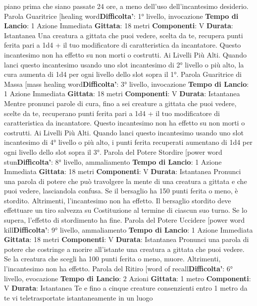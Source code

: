 \begin{multicols}{2}
piano prima che siano passate 24 ore, a meno dell’uso
dell’incantesimo desiderio.
Parola Guaritrice
[healing word\textbf{Difficolta'}:
1° livello, invocazione
\textbf{Tempo di Lancio}: 1 Azione Immediata
\textbf{Gittata}: 18 metri
\textbf{Componenti}: V
\textbf{Durata}: Istantanea
Una creatura a gittata che puoi vedere, scelta da te,
recupera punti ferita pari a 1d4 + il tuo modificatore di
caratteristica da incantatore. Questo incantesimo non
ha effetto su non morti o costrutti.
Ai Livelli Più Alti. Quando lanci questo incantesimo
usando uno slot incantesimo di 2° livello o più alto, la
cura aumenta di 1d4 per ogni livello dello slot sopra il
1°.
Parola Guaritrice di Massa
[mass healing word\textbf{Difficolta'}:
3° livello, invocazione
\textbf{Tempo di Lancio}: 1 Azione Immediata
\textbf{Gittata}: 18 metri
\textbf{Componenti}: V
\textbf{Durata}: Istantanea
Mentre pronunci parole di cura, fino a sei creature a
gittata che puoi vedere, scelte da te, recuperano punti
ferita pari a 1d4 + il tuo modificatore di caratteristica da
incantatore. Questo incantesimo non ha effetto su non
morti o costrutti.
Ai Livelli Più Alti. Quando lanci questo incantesimo
usando uno slot incantesimo di 4° livello o più alto, i
punti ferita recuperati aumentano di 1d4 per ogni livello
dello slot sopra il 3°.
Parola del Potere Stordire
[power word stun\textbf{Difficolta'}:
8° livello, ammaliamento
\textbf{Tempo di Lancio}: 1 Azione Immediata
\textbf{Gittata}: 18 metri
\textbf{Componenti}: V
\textbf{Durata}: Istantanea
Pronunci una parola di potere che può travolgere la
mente di una creatura a gittata e che puoi vedere,
lasciandola confusa. Se il bersaglio ha 150 punti ferita o
meno, è stordito. Altrimenti, l’incantesimo non ha
effetto.
Il bersaglio stordito deve effettuare un tiro salvezza su
Costituzione al termine di ciascun suo turno. Se lo
supera, l’effetto di stordimento ha fine.
Parola del Potere Uccidere
[power word kill\textbf{Difficolta'}:
9° livello, ammaliamento
\textbf{Tempo di Lancio}: 1 Azione Immediata
\textbf{Gittata}: 18 metri
\textbf{Componenti}: V
\textbf{Durata}: Istantanea
Pronunci una parola di potere che costringe a morire
all’istante una creatura a gittata che puoi vedere. Se la
creatura che scegli ha 100 punti ferita o meno, muore.
Altrimenti, l’incantesimo non ha effetto.
Parola del Ritiro
[word of recall\textbf{Difficolta'}:
6° livello, evocazione
\textbf{Tempo di Lancio}: 2 Azioni
\textbf{Gittata}: 1 metro
\textbf{Componenti}: V
\textbf{Durata}: Istantanea
Te e fino a cinque creature consenzienti entro 1 metro
da te vi teletrasportate istantaneamente in un luogo

\end{multicols}
